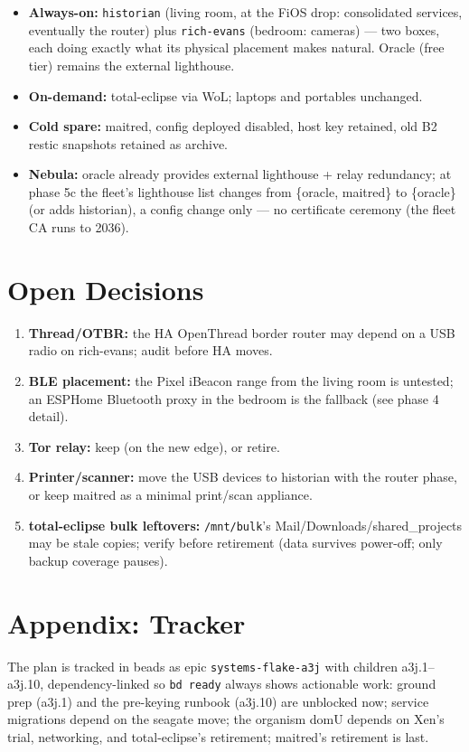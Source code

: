 \documentclass[11pt,letterpaper,headings=small]{scrartcl}
\begin{document}
\begin{itemize}
  \item \textbf{Always-on:} \texttt{historian} (living room, at the
        FiOS drop: consolidated services, eventually the router) plus
        \texttt{rich-evans} (bedroom: cameras) --- two boxes, each
        doing exactly what its physical placement makes natural.
        Oracle (free tier) remains the external lighthouse.
  \item \textbf{On-demand:} total-eclipse via WoL; laptops and portables
        unchanged.
  \item \textbf{Cold spare:} maitred, config deployed disabled, host key
        retained, old B2 restic snapshots retained as archive.
  \item \textbf{Nebula:} oracle already provides external lighthouse +
        relay redundancy; at phase 5c the fleet's lighthouse list
        changes from \{oracle, maitred\} to \{oracle\} (or adds
        historian), a config change only --- no certificate ceremony
        (the fleet CA runs to 2036).
\end{itemize}

\section{Open Decisions}

\begin{enumerate}
  \item \textbf{Thread/OTBR:} the HA OpenThread border router may
        depend on a USB radio on rich-evans; audit before HA moves.
  \item \textbf{BLE placement:} the Pixel iBeacon range from the living
        room is untested; an ESPHome Bluetooth proxy in the bedroom is
        the fallback (see phase 4 detail).
  \item \textbf{Tor relay:} keep (on the new edge), or retire.
  \item \textbf{Printer/scanner:} move the USB devices to historian with
        the router phase, or keep maitred as a minimal print/scan
        appliance.
  \item \textbf{total-eclipse bulk leftovers:} \texttt{/mnt/bulk}'s
        Mail/Downloads/shared\_projects may be stale copies; verify
        before retirement (data survives power-off; only backup
        coverage pauses).
\end{enumerate}

\section*{Appendix: Tracker}

The plan is tracked in beads as epic \texttt{systems-flake-a3j} with
children a3j.1--a3j.10, dependency-linked so \texttt{bd ready} always
shows actionable work: ground prep (a3j.1) and the pre-keying runbook
(a3j.10) are unblocked now; service migrations depend on the seagate
move; the organism domU depends on Xen's trial, networking, and
total-eclipse's retirement; maitred's retirement is last.
\end{document}
